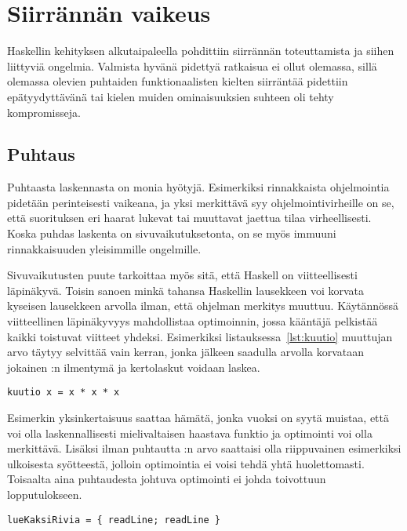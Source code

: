 \documentclass[finnish]{tktltiki2}
\begin{document}
\section{Siirrännän vaikeus}

Haskellin kehityksen alkutaipaleella pohdittiin siirrännän toteuttamista ja siihen liittyviä
ongelmia. Valmista hyvänä pidettyä ratkaisua ei ollut olemassa, sillä olemassa olevien puhtaiden
funktionaalisten kielten siirräntää pidettiin epätyydyttävänä tai kielen muiden ominaisuuksien
suhteen oli tehty kompromisseja.

\subsection{Puhtaus}

Puhtaasta laskennasta on monia hyötyjä. Esimerkiksi rinnakkaista ohjelmointia pidetään perinteisesti
vaikeana, ja yksi merkittävä syy ohjelmointivirheille on se, että suorituksen eri haarat lukevat tai
muuttavat jaettua tilaa virheellisesti. Koska puhdas laskenta on sivuvaikutuksetonta, on se myös
immuuni rinnakkaisuuden yleisimmille ongelmille.

Sivuvaikutusten puute tarkoittaa myös sitä, että Haskell on viitteellisesti läpinäkyvä. Toisin
sanoen minkä tahansa Haskellin lausekkeen voi korvata kyseisen lausekkeen arvolla ilman, että
ohjelman merkitys muuttuu. Käytännössä viitteellinen läpinäkyvyys mahdollistaa optimoinnin, jossa
kääntäjä pelkistää kaikki toistuvat viitteet yhdeksi. Esimerkiksi listauksessa~\ref{lst:kuutio}
muuttujan  arvo täytyy selvittää vain kerran, jonka jälkeen saadulla arvolla korvataan
jokainen :n ilmentymä ja kertolaskut voidaan laskea.

\begin{lstlisting}[float,label={lst:kuutio},caption={Puhdasta laskentaa}]
kuutio x = x * x * x
\end{lstlisting}

Esimerkin yksinkertaisuus saattaa hämätä, jonka vuoksi on syytä muistaa, että  voi olla
laskennallisesti mielivaltaisen haastava funktio ja optimointi voi olla merkittävä. Lisäksi
ilman puhtautta :n arvo saattaisi olla riippuvainen esimerkiksi ulkoisesta syötteestä,
jolloin optimointia ei voisi tehdä yhtä huolettomasti. Toisaalta aina puhtaudesta johtuva
optimointi ei johda toivottuun lopputulokseen.

\begin{lstlisting}[float,label={lst:samat},caption={Kaksi samaa funktiota}]
lueKaksiRivia = { readLine; readLine }
\end{lstlisting}
\end{document}
